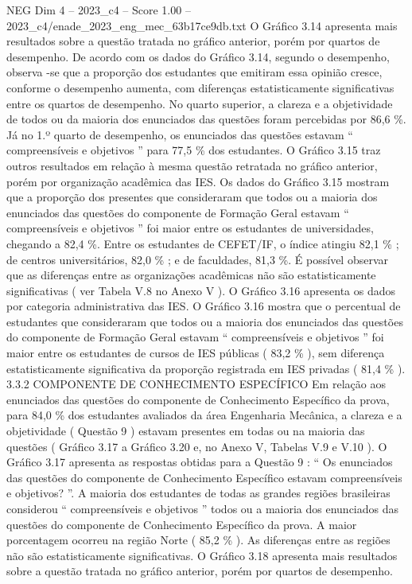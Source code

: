 \begin{textsample}{NEG Dim 4 – 2023\_c4 – Score 1.00 – 2023\_c4/enade\_2023\_eng\_mec\_63b17ce9db.txt}
O Gráfico 3.14 apresenta mais resultados sobre a questão tratada no gráfico anterior, porém por quartos de desempenho.
De acordo com os dados do Gráfico 3.14, segundo o desempenho, observa -se que a proporção dos estudantes que emitiram essa opinião cresce, conforme o desempenho aumenta, com diferenças estatisticamente significativas entre os quartos de desempenho.
No quarto superior, a clareza e a objetividade de todos ou da maioria dos enunciados das questões foram percebidas por 86,6 \%.
Já no 1.º quarto de desempenho, os enunciados das questões estavam “ compreensíveis e objetivos ” para 77,5 \% dos estudantes.
O Gráfico 3.15 traz outros resultados em relação à mesma questão retratada no gráfico anterior, porém por organização acadêmica das IES.
Os dados do Gráfico 3.15 mostram que a proporção dos presentes que consideraram que todos ou a maioria dos enunciados das questões do componente de Formação Geral estavam “ compreensíveis e objetivos ” foi maior entre os estudantes de universidades, chegando a 82,4 \%.
Entre os estudantes de CEFET/IF, o índice atingiu 82,1 \% ; de centros universitários, 82,0 \% ; e de faculdades, 81,3 \%.
É possível observar que as diferenças entre as organizações acadêmicas não são estatisticamente significativas ( ver Tabela V.8 no Anexo V ).
O Gráfico 3.16 apresenta os dados por categoria administrativa das IES.
O Gráfico 3.16 mostra que o percentual de estudantes que consideraram que todos ou a maioria dos enunciados das questões do componente de Formação Geral estavam “ compreensíveis e objetivos ” foi maior entre os estudantes de cursos de IES públicas ( 83,2 \% ), sem diferença estatisticamente significativa da proporção registrada em IES privadas ( 81,4 \% ). 3.3.2 COMPONENTE DE CONHECIMENTO ESPECÍFICO Em relação aos enunciados das questões do componente de Conhecimento Específico da prova, para 84,0 \% dos estudantes avaliados da área Engenharia Mecânica, a clareza e a objetividade ( Questão 9 ) estavam presentes em todas ou na maioria das questões ( Gráfico 3.17 a Gráfico 3.20 e, no Anexo V, Tabelas V.9 e V.10 ).
O Gráfico 3.17 apresenta as respostas obtidas para a Questão 9 : “ Os enunciados das questões do componente de Conhecimento Específico estavam compreensíveis e objetivos? ”.
A maioria dos estudantes de todas as grandes regiões brasileiras considerou “ compreensíveis e objetivos ” todos ou a maioria dos enunciados das questões do componente de Conhecimento Específico da prova.
A maior porcentagem ocorreu na região Norte ( 85,2 \% ).
As diferenças entre as regiões não são estatisticamente significativas.
O Gráfico 3.18 apresenta mais resultados sobre a questão tratada no gráfico anterior, porém por quartos de desempenho.

\end{textsample}
